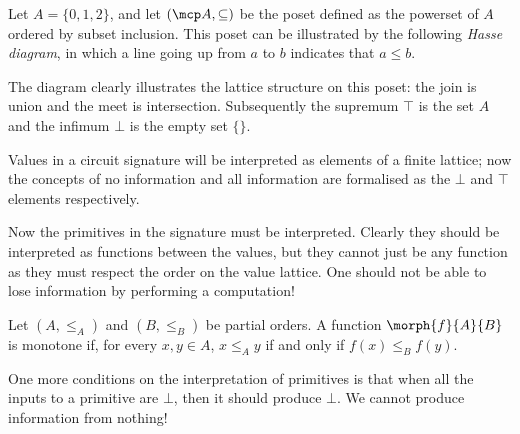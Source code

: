 \begin{example}\label{ex:powerset-lattice}
    Let \(A = \{0,1,2\}\), and let \((\mcp A, \subseteq)\) be the poset defined
    as the powerset of \(A\) ordered by subset inclusion.
    This poset can be illustrated by the following \emph{Hasse diagram}, in
    which a line going up from \(a\) to \(b\) indicates that \(a \leq b\).

    \begin{center}
    \end{center}

    The diagram clearly illustrates the lattice structure on this poset: the
    join is union and the meet is intersection.
    Subsequently the supremum \(\top\) is the set \(A\) and the
    infimum \(\bot\) is the empty set \(\{\}\).
\end{example}

Values in a circuit signature will be interpreted as elements of a finite
lattice; now the concepts of no information and all information are formalised
as the \(\bot\) and \(\top\) elements respectively.

Now the primitives in the signature must be interpreted.
Clearly they should be interpreted as functions between the values, but they
cannot just be any function as they must respect the order on the value lattice.
One should not be able to lose information by performing a computation!

\begin{definition}
    Let \((A, \leq_A)\) and \((B, \leq_B)\) be partial orders.
    A function \(\morph{f}{A}{B}\) is monotone if, for every \(x, y \in A\),
    \(x \leq_A y\) if and only if \(f(x) \leq_B f(y)\).
\end{definition}

One more conditions on the interpretation of primitives is that when all the
inputs to a primitive are \(\bot\), then it should produce \(\bot\).
We cannot produce information from nothing!

